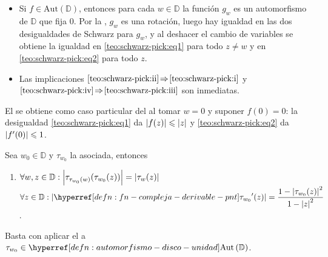\begin{dem}
\begin{itemize}[wide, labelindent=0pt]
        \item[$\text{\ref{teo:schwarz-pick:v}} \!\Rightarrow \!\text{\ref{teo:schwarz-pick:ii}} \!\we \!\text{\ref{teo:schwarz-pick:iv}}$:] Si $f \in \mathrm{Aut}\left(\mathbb{D}\right)$, entonces para cada $w \in \mathbb{D}$ la función $g_w$ es un automorfismo de $\mathbb{D}$ que fija $0$. Por la , $g_w$ es una rotación, luego hay igualdad en las dos desigualdades de Schwarz para $g_w$, y al deshacer el cambio de variables se obtiene la igualdad en \ref{teo:schwarz-pick:eq1} para todo $z \neq w$ y en \ref{teo:schwarz-pick:eq2} para todo $z$.

        \item[] Las implicaciones $\text{\ref{teo:schwarz-pick:ii}} \!\Rightarrow \!\text{\ref{teo:schwarz-pick:i}}$ y $\text{\ref{teo:schwarz-pick:iv}} \!\Rightarrow \!\text{\ref{teo:schwarz-pick:iii}}$ son inmediatas.\hfill\qedsymbol
    \end{itemize}
\end{dem}

\begin{obs}
    El  se obtiene como caso particular del  al tomar $w = 0$ y suponer $f(0) = 0$: la desigualdad \ref{teo:schwarz-pick:eq1} da $\left|f(z)\right| \leqslant \left|z\right|$ y \ref{teo:schwarz-pick:eq2} da $\left|f'(0)\right| \leqslant 1$.
\end{obs}

\begin{cor}\label{cor:schwarz-pick-involucion-disco-unidad}
    Sea $w_0 \in \mathbb{D}$ y $\tau_{w_0}$ la  asociada, entonces
    \begin{enumerate}[label=\textnormal{(\arabic*)}]
        \item $\displaystyle \forall w, z \in \mathbb{D} : \left|\tau_{\tau_{w_0}(w) }(\tau_{w_0}(z))\right| = \left|\tau_w(z)\right|$
        \hspace{0.5em}\inlineitem $\ds \forall z \in \mathbb{D} : \abs{\exhyperref[defn:fn-compleja-derivable-pnt]{fn-compleja-derivable-pnt}{{\tau_{w_0}}'}(z)} = \frac{1 - \abs{\tau_{w_0}(z)}^2}{1 - \abs{z}^2}$.
    \end{enumerate}
\end{cor}
\begin{dem}
    Basta con aplicar el  a $\tau_{w_0} \in \exhyperref[defn:automorfismo-disco-unidad]{automorfismo-disco-unidad}{\mathrm{Aut} \left(\mathbb{D} \right)}$.\hfill\qedsymbol
\end{dem}

